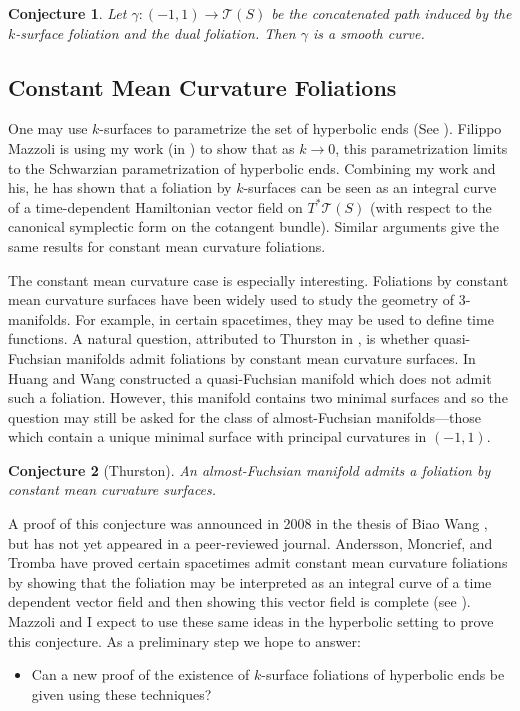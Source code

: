 \documentclass[11pt]{amsart}
\newtheorem{conj}{Conjecture}
\begin{document}
\begin{conj}
\label{deSitter path}
Let $\gamma: (-1,1) \to \mathcal{T}(S)$ be the concatenated path induced by the $k$-surface foliation and the dual foliation. Then $\gamma$ is a smooth curve. 
\end{conj}



\subsection{Constant Mean Curvature Foliations}
One may use $k$-surfaces to parametrize the set of hyperbolic ends (See \cite{labourie1992}). Filippo Mazzoli is using my work (in \cite{mazzoli2019}) to show that as $k \to 0$, this parametrization limits to the Schwarzian parametrization of hyperbolic ends. Combining my work and his, he has shown that a foliation by $k$-surfaces can be seen as an integral curve of a time-dependent Hamiltonian vector field on $T^*\mathcal{T}(S)$ (with respect to the canonical symplectic form on the cotangent bundle). Similar arguments give the same results for constant mean curvature foliations. 

The constant mean curvature case is especially interesting. Foliations by constant mean curvature surfaces have been widely used to study the geometry of 3-manifolds. For example, in certain spacetimes, they may be used to define time functions. A natural question, attributed to Thurston in \cite{huang-wang2013}, is
whether quasi-Fuchsian manifolds admit foliations by constant mean curvature surfaces. In \cite{huang-wang2013} Huang and Wang constructed a quasi-Fuchsian manifold which does not admit such a foliation. However, this manifold contains two minimal surfaces and so the question may still be asked for the class of almost-Fuchsian manifolds---those which contain a unique minimal surface with principal curvatures in $(-1,1)$.
\begin{conj}[Thurston]
\label{almost Fuchsian cmc}
An almost-Fuchsian manifold admits a foliation by constant mean curvature surfaces.
\end{conj}
A proof of this conjecture was announced in 2008 in the thesis of Biao Wang \cite{wang2008}, but has not yet appeared in a peer-reviewed journal. Andersson, Moncrief, and Tromba have proved certain spacetimes admit constant mean curvature foliations by showing that the foliation may be interpreted as an integral curve of a time dependent vector field and then showing this vector field is complete (see \cite{andersson-moncrief-tromba1997}). Mazzoli and I expect to use these same ideas in the hyperbolic setting to prove this conjecture. As a preliminary step we hope to answer: 
\begin{itemize}
\item Can a new proof of the existence of $k$-surface foliations of hyperbolic ends be given using these techniques?
\end{itemize}
\end{document}
